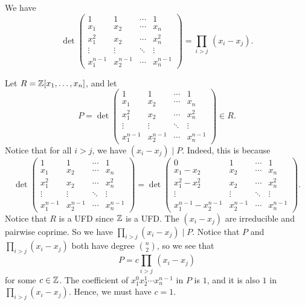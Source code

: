\begin{lemma}{}
    We have 
    \[ \det\begin{pmatrix}
        1 & 1 & \cdots & 1 \\ 
        x_1 & x_2 & \cdots & x_n \\ 
        x_1^2 & x_2 & \cdots & x_n^2 \\ 
        \vdots & \vdots & \ddots & \vdots \\ 
        x_1^{n-1} & x_2^{n-1} & \cdots & x_n^{n-1}
    \end{pmatrix} = \prod_{i>j}\,(x_i - x_j). \] 
\end{lemma}
\begin{pf}
    Let $R = \mathbb{Z}[x_1, \dots, x_n]$, and let 
    \[ P = \det\begin{pmatrix}
        1 & 1 & \cdots & 1 \\ 
        x_1 & x_2 & \cdots & x_n \\ 
        x_1^2 & x_2 & \cdots & x_n^2 \\ 
        \vdots & \vdots & \ddots & \vdots \\ 
        x_1^{n-1} & x_2^{n-1} & \cdots & x_n^{n-1}
    \end{pmatrix} \in R. \] 
    Notice that for all $i > j$, we have $(x_i - x_j) \mid P$. Indeed, this is 
    because 
    \[ \det\begin{pmatrix}
        1 & 1 & \cdots & 1 \\ 
        x_1 & x_2 & \cdots & x_n \\ 
        x_1^2 & x_2 & \cdots & x_n^2 \\ 
        \vdots & \vdots & \ddots & \vdots \\ 
        x_1^{n-1} & x_2^{n-1} & \cdots & x_n^{n-1}
    \end{pmatrix} = \det\begin{pmatrix}
        0 & 1 & \cdots & 1 \\ 
        x_1 - x_2 & x_2 & \cdots & x_n \\ 
        x_1^2 - x_2^2 & x_2 & \cdots & x_n^2 \\ 
        \vdots & \vdots & \ddots & \vdots \\ 
        x_1^{n-1} - x_2^{n-1} & x_2^{n-1} & \cdots & x_n^{n-1}
    \end{pmatrix}. \] 
    Notice that $R$ is a UFD since $\mathbb{Z}$ is a UFD. The $(x_i - x_j)$ are 
    irreducible and pairwise coprime. So we have $\prod_{i>j} (x_i - x_j) \mid P$. 
    Notice that $P$ and $\prod_{i>j} (x_i - x_j)$ both have degree $\binom{n}{2}$, 
    so we see that 
    \[ P = c \prod_{i>j}\,(x_i - x_j) \] 
    for some $c \in \mathbb{Z}$. The coefficient of $x_1^0 x_2^1 \cdots x_n^{n-1}$ in $P$ 
    is $1$, and it is also $1$ in $\prod_{i>j} (x_i - x_j)$. Hence, we must have 
    $c = 1$. 
\end{pf}


